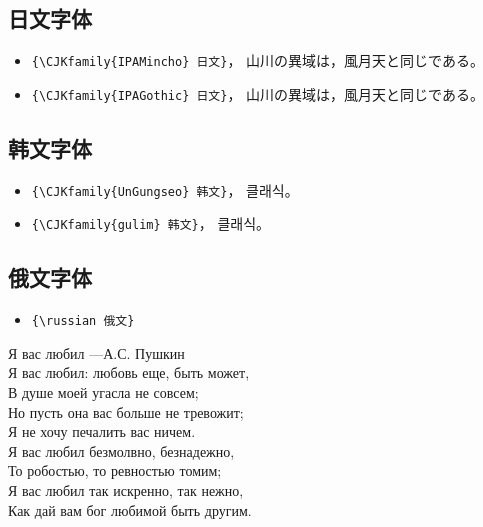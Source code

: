 \subsection{日文字体}
\begin{itemize}
\item \verb"{\CJKfamily{IPAMincho} 日文}"，{ 山川の異域は，風月天と同じである。}
\item \verb"{\CJKfamily{IPAGothic} 日文}"，{ 山川の異域は，風月天と同じである。}
\end{itemize}





\subsection{韩文字体}

\begin{itemize}
\item \verb"{\CJKfamily{UnGungseo} 韩文}"，{ 클래식}。
\item \verb"{\CJKfamily{gulim} 韩文}"，{ 클래식}。
\end{itemize}

\subsection{俄文字体}

\begin{itemize}
\item \verb"{\russian 俄文}"
\end{itemize}
\begin{center}
\russian 
{\large Я вас любил ---А.С. Пушкин} \\
\vspace{0.5cm}
Я вас любил: любовь еще, быть может, \\
В душе моей угасла не совсем; \\
Но пусть она вас больше не тревожит; \\
Я не хочу печалить вас ничем. \\
Я вас любил безмолвно, безнадежно, \\
То робостью, то ревностью томим; \\
Я вас любил так искренно, так нежно, \\
Как дай вам бог любимой быть другим. \\
\end{center}



